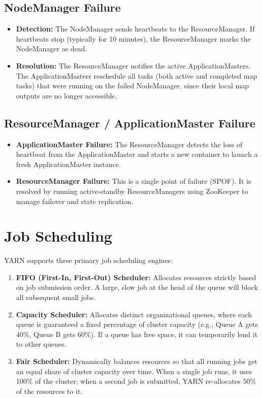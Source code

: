 \documentclass[12pt,a4paper]{article}
\begin{document}
\subsection{NodeManager Failure}
\begin{itemize}[leftmargin=*, itemsep=3pt]
  \item \textbf{Detection:} The NodeManager sends heartbeats to the ResourceManager. If heartbeats stop (typically for 10 minutes), the ResourceManager marks the NodeManager as dead.
  \item \textbf{Resolution:} The ResourceManager notifies the active ApplicationMasters. The ApplicationMasters reschedule all tasks (both active and completed map tasks) that were running on the failed NodeManager, since their local map outputs are no longer accessible.
\end{itemize}

\subsection{ResourceManager / ApplicationMaster Failure}
\begin{itemize}[leftmargin=*, itemsep=3pt]
  \item \textbf{ApplicationMaster Failure:} The ResourceManager detects the loss of heartbeat from the ApplicationMaster and starts a new container to launch a fresh ApplicationMaster instance.
  \item \textbf{ResourceManager Failure:} This is a single point of failure (SPOF). It is resolved by running active-standby ResourceManagers using ZooKeeper to manage failover and state replication.
\end{itemize}

\section{Job Scheduling}

YARN supports three primary job scheduling engines:

\begin{enumerate}[leftmargin=*, itemsep=4pt]
  \item \textbf{FIFO (First-In, First-Out) Scheduler:} Allocates resources strictly based on job submission order. A large, slow job at the head of the queue will block all subsequent small jobs.
  \item \textbf{Capacity Scheduler:} Allocates distinct organizational queues, where each queue is guaranteed a fixed percentage of cluster capacity (e.g., Queue A gets 40\%, Queue B gets 60\%). If a queue has free space, it can temporarily lend it to other queues.
  \item \textbf{Fair Scheduler:} Dynamically balances resources so that all running jobs get an equal share of cluster capacity over time. When a single job runs, it uses 100\% of the cluster; when a second job is submitted, YARN re-allocates 50\% of the resources to it.
\end{enumerate}
\end{document}
